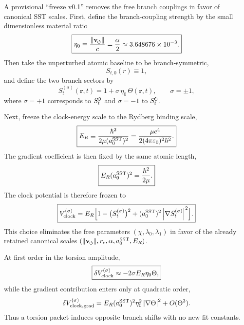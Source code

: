 \documentclass[11pt,a4paper]{article}
\newcommand{\swirlarrow}{\mathchoice{\mkern-2mu\scriptstyle\boldsymbol{\circlearrowleft}}{\mkern-2mu\scriptstyle\boldsymbol{\circlearrowleft}}{\mkern-2mu\scriptscriptstyle\boldsymbol{\circlearrowleft}}{\mkern-2mu\scriptscriptstyle\boldsymbol{\circlearrowleft}}}
\newcommand{\swirlarrowcw}{\mathchoice{\mkern-2mu\scriptstyle\boldsymbol{\circlearrowright}}{\mkern-2mu\scriptstyle\boldsymbol{\circlearrowright}}{\mkern-2mu\scriptscriptstyle\boldsymbol{\circlearrowright}}{\mkern-2mu\scriptscriptstyle\boldsymbol{\circlearrowright}}}
\newcommand{\vswirl}{\mathbf{v}_{\swirlarrow}}
\newcommand{\SwirlClock}{S_t^{\swirlarrow}}
\newcommand{\SwirlClockcw}{S_t^{\swirlarrowcw}}
\newcommand{\rc}{r_c}
\begin{document}
A provisional ``freeze v0.1'' removes the free branch couplings in favor of canonical SST scales. First, define the branch-coupling strength by the small dimensionless material ratio
\begin{equation}
\label{eq:eta0}
\boxed{
\eta_0 \equiv \frac{\lVert\vswirl\rVert}{c} = \frac{\alpha}{2} \approx 3.648676\times 10^{-3}.
}
\end{equation}
Then take the unperturbed atomic baseline to be branch-symmetric,
\begin{equation}
\label{eq:St0freeze}
S_{t,0}(r)\equiv 1,
\end{equation}
and define the two branch sectors by
\begin{equation}
\label{eq:StBranches}
\boxed{
S_t^{(\sigma)}(\mathbf r,t)=1+\sigma\,\eta_0\,\Theta(\mathbf r,t),
\qquad
\sigma=\pm 1,
}
\end{equation}
where $\sigma=+1$ corresponds to $\SwirlClock$ and $\sigma=-1$ to $\SwirlClockcw$.

Next, freeze the clock-energy scale to the Rydberg binding scale,
\begin{equation}
\label{eq:ERfreeze}
\boxed{
E_R \equiv \frac{\hbar^2}{2\mu (a_0^{\rm SST})^2}
= \frac{\mu e^4}{2(4\pi\varepsilon_0)^2\hbar^2}.
}
\end{equation}
The gradient coefficient is then fixed by the same atomic length,
\begin{equation}
\label{eq:lambda1freeze}
\boxed{
E_R (a_0^{\rm SST})^2 = \frac{\hbar^2}{2\mu}.
}
\end{equation}
The clock potential is therefore frozen to
\begin{equation}
\label{eq:Vclock}
\boxed{
V_{\rm clock}^{(\sigma)}
=
E_R\Bigl[1-\bigl(S_t^{(\sigma)}\bigr)^2 + (a_0^{\rm SST})^2\,\abs{\nabla S_t^{(\sigma)}}^2\Bigr].
}
\end{equation}
This choice eliminates the free parameters $(\chi,\lambda_0,\lambda_1)$ in favor of the already retained canonical scales $(\lVert\vswirl\rVert,\rc,\alpha,a_0^{\rm SST},E_R)$.

At first order in the torsion amplitude,
\begin{equation}
\label{eq:Vclock-linear}
\boxed{
\delta V_{\rm clock}^{(\sigma)}
\approx
-2\sigma E_R\eta_0\Theta,
}
\end{equation}
while the gradient contribution enters only at quadratic order,
\begin{equation}
\label{eq:Vclock-grad2}
\delta V_{\rm clock,grad}^{(\sigma)}
= E_R (a_0^{\rm SST})^2\eta_0^2\,\abs{\nabla\Theta}^2 + O(\Theta^3).
\end{equation}
Thus a torsion packet induces opposite branch shifts with no new fit constants.
\end{document}

